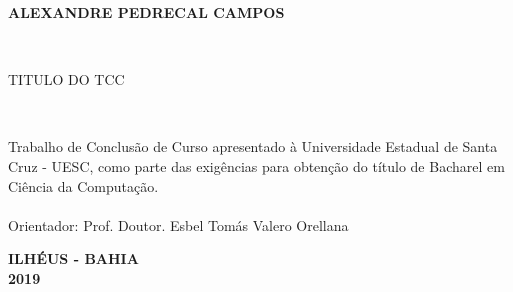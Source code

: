 
\begin{center}

    {\large \begin{large} \bfseries ALEXANDRE PEDRECAL CAMPOS \end{large}\\}
    \vspace{8cm}
    {\large\bfseries{\begin{large}TITULO DO TCC\end{large}}\\}
    \vspace{1cm}
    \hspace{.45\linewidth}
    \begin{minipage}{.50\linewidth}
            Trabalho de Conclusão de Curso apresentado à Universidade Estadual de Santa Cruz - UESC, como parte das exigências para obtenção do título de Bacharel em Ciência da Computação.
            \\
            \\ Orientador: Prof. Doutor. Esbel Tomás Valero Orellana


    \end{minipage}

    \vspace{2cm}
    \vfill
    {\large\bfseries{ ILHÉUS - BAHIA \\ 2019}}
\end{center}

